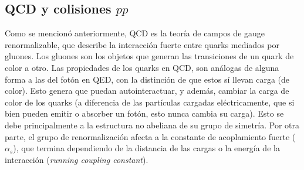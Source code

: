 



\subsection{QCD y colisiones $pp$}\label{sec:qcd_pp}

Como se mencionó anteriormente, QCD \cite{qcd_collider, Tripiana:1433788} es la teoría de campos de gauge renormalizable,
que describe la interacción fuerte entre quarks mediados por gluones. Los gluones son los objetos que generan las transiciones de un quark de color a otro. Las propiedades de los quarks en QCD, son análogas de alguna forma a las del fotón en QED, con la distinción de que estos sí llevan carga (de color). Esto genera que puedan autointeractuar, y además, cambiar la carga de color de los quarks (a diferencia de las partículas cargadas eléctricamente, que si bien pueden emitir o absorber un fotón, esto nunca cambia su carga). Esto se debe principalmente a la estructura no abeliana de su grupo de simetría.
Por otra parte, el grupo de renormalización afecta a la constante de acoplamiento fuerte ($\alpha_s$), que termina dependiendo de la distancia de las cargas o la energía de la interacción (\textit{running coupling constant}). 

